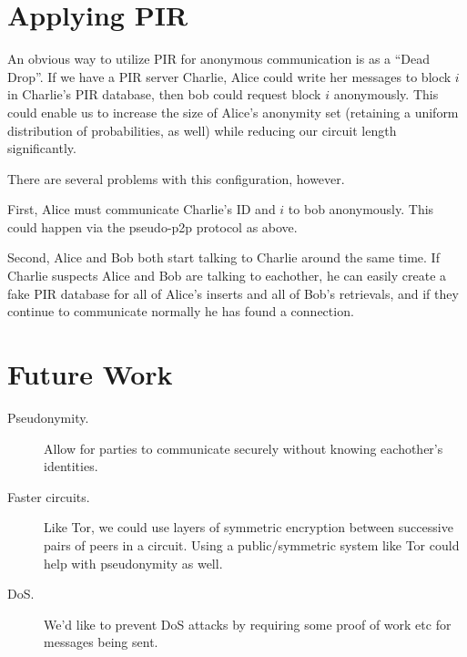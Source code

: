 \documentclass[twocolumn]{paper}
\begin{document}
\section{Applying PIR}
An obvious way to utilize PIR for anonymous communication is as a ``Dead Drop''. If we have a PIR server Charlie, Alice could write her messages to block $i$ in Charlie's PIR database, then bob could request block $i$ anonymously. This could enable us to increase the size of Alice's anonymity set (retaining a uniform distribution of probabilities, as well) while reducing our circuit length significantly. 

There are several problems with this configuration, however.

First, Alice must communicate Charlie's ID and $i$ to bob anonymously. This could happen via the pseudo-p2p protocol as above. 

Second, Alice and Bob both start talking to Charlie around the same time. If Charlie suspects Alice and Bob are talking to eachother, he can easily create a fake PIR database for all of Alice's inserts and all of Bob's retrievals, and if they continue to communicate normally he has found a connection. 


\section{Future Work}
\begin{description}
  \item[Pseudonymity.] Allow for parties to communicate securely without knowing eachother's identities.
  \item[Faster circuits.] Like Tor, we could use layers of symmetric encryption between successive pairs of peers in a circuit. Using a public/symmetric system like Tor could help with pseudonymity as well.
  \item[DoS.] We'd like to prevent DoS attacks by requiring some proof of work etc for messages being sent.
\end{description}

\newpage



\end{document}
